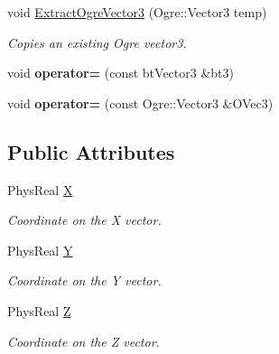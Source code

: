 \begin{DoxyCompactItemize}
void \hyperlink{classPhysVector3_a422acbc95f72d00a26cb477ab7db5e87}{ExtractOgreVector3} (Ogre::Vector3 temp)
\begin{DoxyCompactList}\small\item\em Copies an existing Ogre vector3. \item\end{DoxyCompactList}\item 
\hypertarget{classPhysVector3_a76af5753ff1a65261bcb0d543999eb3e}{
void {\bfseries operator=} (const btVector3 \&bt3)}
\label{da/d11/classPhysVector3_a76af5753ff1a65261bcb0d543999eb3e}

\item 
\hypertarget{classPhysVector3_a00323a54e86ab2e6cf41ddbfbc2a97cd}{
void {\bfseries operator=} (const Ogre::Vector3 \&OVec3)}
\label{da/d11/classPhysVector3_a00323a54e86ab2e6cf41ddbfbc2a97cd}

\end{DoxyCompactItemize}
\subsection*{Public Attributes}
\begin{DoxyCompactItemize}
\item 
\hypertarget{classPhysVector3_ac4586254a6116c616046bd9d5b35ca31}{
PhysReal \hyperlink{classPhysVector3_ac4586254a6116c616046bd9d5b35ca31}{X}}
\label{da/d11/classPhysVector3_ac4586254a6116c616046bd9d5b35ca31}

\begin{DoxyCompactList}\small\item\em Coordinate on the X vector. \item\end{DoxyCompactList}\item 
\hypertarget{classPhysVector3_a9bf4609392a492c2b3e278d635ed976a}{
PhysReal \hyperlink{classPhysVector3_a9bf4609392a492c2b3e278d635ed976a}{Y}}
\label{da/d11/classPhysVector3_a9bf4609392a492c2b3e278d635ed976a}

\begin{DoxyCompactList}\small\item\em Coordinate on the Y vector. \item\end{DoxyCompactList}\item 
\hypertarget{classPhysVector3_a0c0585976cb4c215626e205a2c663226}{
PhysReal \hyperlink{classPhysVector3_a0c0585976cb4c215626e205a2c663226}{Z}}
\label{da/d11/classPhysVector3_a0c0585976cb4c215626e205a2c663226}

\begin{DoxyCompactList}\small\item\em Coordinate on the Z vector. \item\end{DoxyCompactList}\end{DoxyCompactItemize}



